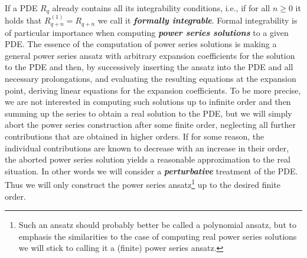 If a PDE $R_q$ already contains all its integrability conditions, i.e., if for all $n\geq 0$ it holds that $R_{q+n}^{(1)} = R_{q+n}$ we call it \textit{\textbf{formally integrable}}.
Formal integrability is of particular importance when computing \textbf{\textit{power series solutions}} to a given PDE. The essence of the computation of power series solutions is making a general power series ansatz with arbitrary expansion coefficients for the solution to the PDE and then, by successively inserting the ansatz into the PDE and all necessary prolongations, and evaluating the resulting equations at the expansion point, deriving linear equations for the expansion coefficients. 
To be more precise, we are not interested in computing such solutions up to infinite order and then summing up the series to obtain a real solution to the PDE, but we will simply abort the power series construction after some finite order, neglecting all further contributions that are obtained in higher orders.
If for some reason, the individual contributions are known to decrease with an increase in their order, the aborted power series solution yields a reasonable approximation to the real situation. 
In other words we will consider a \textit{\textbf{perturbative}} treatment of the PDE.
Thus we will only construct the power series ansatz\footnote{Such an ansatz should probably better be called a polynomial ansatz, but to emphasis the similarities to the case of computing real power series solutions we will stick to calling it a (finite) power series ansatz.} up to the desired finite order.

